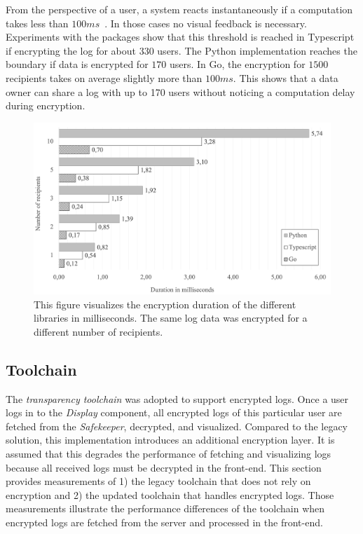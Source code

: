 \documentclass[../main.tex]{subfiles}
\begin{document}
From the perspective of a user, a system reacts instantaneously if a computation takes less than $100ms$~\cite{Nielson1993}.
In those cases no visual feedback is necessary.
Experiments with the packages show that this threshold is reached in Typescript if encrypting the log for about $330$ users.
The Python implementation reaches the boundary if data is encrypted for $170$ users.
In Go, the encryption for $1500$ recipients takes on average slightly more than $100ms$.
This shows that a data owner can share a log with up to 170 users without noticing a computation delay during encryption.


\begin{figure}[ht]
    \includegraphics[scale=0.6]{../img/07/performance.png}
    \centering
    \caption[Encryption duration]{This figure visualizes the encryption duration of the different libraries in milliseconds. The same log data was encrypted for a different number of recipients.}
    \label{fig:performance}
\end{figure}

\subsection{Toolchain}
\label{sec:evaluation-perf-toolchain}
The \emph{transparency toolchain} was adopted to support encrypted logs.
Once a user logs in to the \emph{Display} component, all encrypted logs of this particular user are fetched from the \emph{Safekeeper}, decrypted, and visualized.
Compared to the legacy solution, this implementation introduces an additional encryption layer.
It is assumed that this degrades the performance of fetching and visualizing logs because all received logs must be decrypted in the front-end.
This section provides measurements of 
1) the legacy toolchain that does not rely on encryption and
2) the updated toolchain that handles encrypted logs.
Those measurements illustrate the performance differences of the toolchain when encrypted logs are fetched from the server and processed in the front-end.
\end{document}
